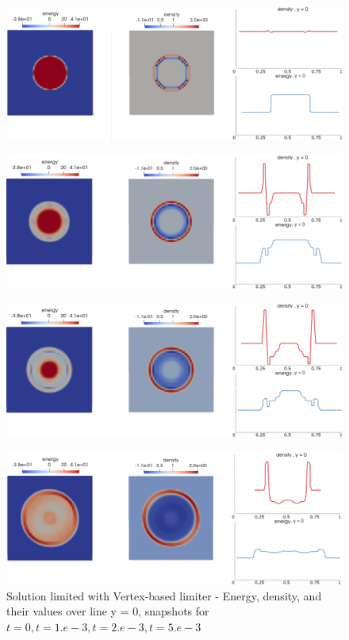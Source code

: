 \begin{figure}[H]
		\begin{center}
			\includegraphics[width=\textwidth]{img/limit/l1.jpg}
		\end{center}
	\end{figure}\vspace{-8mm}
	\begin{figure}[H]
		\begin{center}
			\includegraphics[width=\textwidth]{img/limit/l3.jpg}
		\end{center}
	\end{figure}\vspace{-8mm}
	\begin{figure}[H]
		\begin{center}
			\includegraphics[width=\textwidth]{img/limit/l4.jpg}
		\end{center}
	\end{figure}\vspace{-8mm}
	\begin{figure}[H]
		\begin{center}
			\includegraphics[width=\textwidth]{img/limit/l6.jpg}
			\caption{Solution limited with Vertex-based limiter - Energy, density, and their values over line y = 0, snapshots for $t = 0, t = 1.e-3, t = 2.e-3, t = 5.e-3$}
		\end{center}
	\end{figure}
